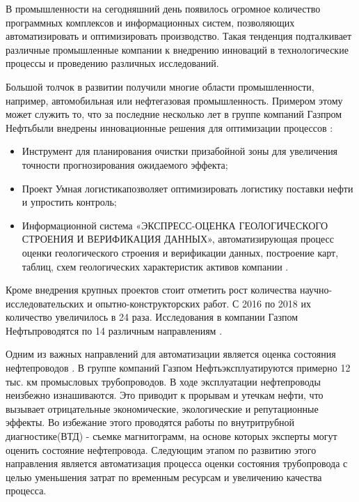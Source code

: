 \documentclass[a4paper,article,14pt]{extarticle}
\begin{document}


\tableofcontents
\pagebreak


В промышленности на сегодняшний день появилось огромное количество программных комплексов и 
информационных систем, позволяющих автоматизировать и оптимизировать производство. 
Такая тенденция подталкивает различные промышленные компании к внедрению инноваций 
в технологические процессы и проведению различных исследований. 

Большой толчок в развитии получили многие области промышленности, например, автомобильная или нефтегазовая промышленность. 
Примером этому может служить то, что за последние несколько лет в группе компаний \flqq Газпром Нефть\frqq были 
внедрены инновационные решения для оптимизации процессов \cite{j1}:
\begin{itemize}
    \item Инструмент для планирования очистки призабойной зоны для увеличения точности прогнозирования ожидаемого эффекта;
    \item Проект \flqq Умная логистика\frqq позволяет оптимизировать логистику поставки нефти и упростить контроль;
    \item Информационной система «ЭКСПРЕСС-ОЦЕНКА ГЕОЛОГИЧЕСКОГО СТРОЕНИЯ И ВЕРИФИКАЦИЯ ДАННЫХ», 
    автоматизирующая процесс оценки геологического строения и верификации данных, построение карт, 
    таблиц, схем геологических характеристик активов компании \cite{s1}.
\end{itemize}

Кроме внедрения крупных проектов стоит отметить рост количества научно-исследовательских и опытно-конструкторских работ. 
С 2016 по 2018 их количество увеличилось в 24 раза. Исследования в компании 
\flqq Газпом Нефть\frqq проводятся по 14 различным направлениям \cite{j2}.

Одним из важных направлений для автоматизации является оценка состояния нефтепроводов \cite{a1}.
В группе компаний \flqq Газпом Нефть\frqq эксплуатируются примерно 12 тыс. км промысловых трубопроводов. В ходе эксплуатации нефтепроводы неизбежно изнашиваются. 
Это приводит к прорывам и утечкам нефти, что вызывает отрицательные экономические, экологические и репутационные эффекты. 
Во избежание этого проводятся работы по внутритрубной диагностике(ВТД) - съемке магнитограмм, на основе которых эксперты могут оценить состояние нефтепровода. 
Следующим этапом по развитию этого направления является автоматизация процесса оценки состояния трубопровода 
с целью уменьшения затрат по временным ресурсам и увеличению качества процесса.
\end{document}
